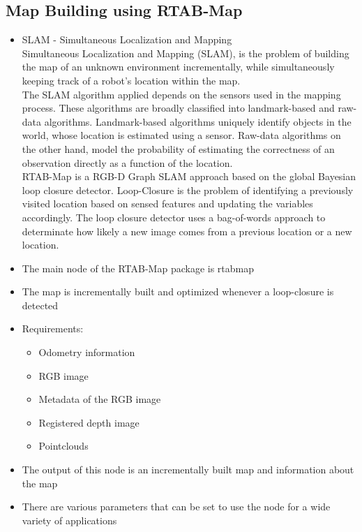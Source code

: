\documentclass[a4paper,12pt,oneside]{book}
\begin{document}
\subsection*{Map Building using RTAB-Map}
\begin{itemize}

	\item SLAM - Simultaneous Localization and Mapping \\
	Simultaneous Localization and Mapping (SLAM), is the problem of building the map of an unknown environment incrementally, while simultaneously keeping track of a robot's location within the map. \\
	The SLAM algorithm applied depends on the sensors used in the mapping process. These algorithms are broadly classified into landmark-based and raw-data algorithms. Landmark-based algorithms uniquely identify objects in the world, whose location is estimated using a sensor. Raw-data algorithms on the other hand, model the probability of estimating the correctness of an observation directly as a function of the location. \\
	RTAB-Map is a RGB-D Graph SLAM approach based on the global Bayesian loop closure detector. Loop-Closure is the problem of identifying a previously visited location based on sensed features and updating the variables accordingly. The loop closure detector uses a bag-of-words approach to determinate how likely a new image comes from a previous location or a new location.	

	\item The main node of the RTAB-Map package is rtabmap
	\item The map is incrementally built and optimized whenever a loop-closure is detected
	\item Requirements:
		\begin{itemize}
			\item Odometry information
			\item RGB image
			\item Metadata of the RGB image
			\item Registered depth image
			\item Pointclouds
		\end{itemize}
	\item The output of this node is an incrementally built map and information about the map
	\item There are various parameters that can be set to use the node for a wide variety of applications

\end{itemize}
\end{document}
